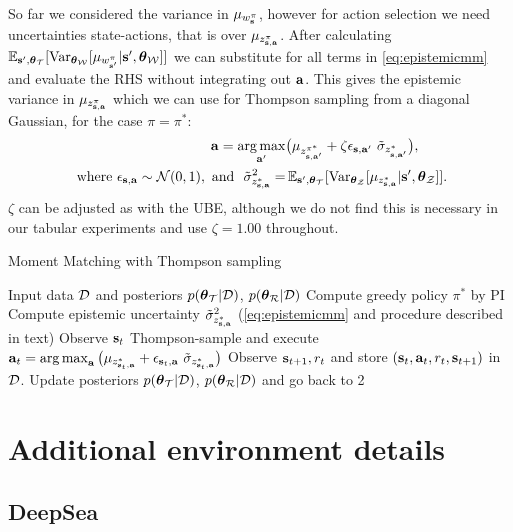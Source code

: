 \documentclass{article}
\begin{document}
\begin{appendices}
So far we considered the variance in $\mu_{w^\pi_{\mathbf{s}}}$, however for action selection we need uncertainties state-actions, that is over $\mu_{z^\pi_{\mathbf{s}, \mathbf{a}}}$. After calculating $\operatorname{\mathbb{E}}_{\mathbf{s}', \boldsymbol{\theta}_{\mathcal{T}}}[\operatorname{\text{Var}}_{\boldsymbol{\theta}_{\mathcal{W}}} [ \mu_{w^\pi_{\mathbf{s}'}} | \mathbf{s}', \boldsymbol{\theta}_{\mathcal{W}}]]$ we can substitute for all terms in \cref{eq:epistemicmm} and evaluate the RHS without integrating out $\mathbf{a}$. This gives the epistemic variance in $\mu_{z^\pi_{\mathbf{s}, \mathbf{a}}}$ which we can use for Thompson sampling from a diagonal Gaussian, for the case $\pi = \pi^*$:
\begin{align*}
\mathbf{a} = \operatorname*{arg\,max}_{\mathbf{a}'} &\big(\mu_{z^{{\pi^*}}_{\mathbf{s}, \mathbf{a}'}} + \zeta \epsilon_{\mathbf{s}, \mathbf{a}'}~\tilde{\sigma}_{z^*_{\mathbf{s}, \mathbf{a}'}} \big),\\
\text{ where } \epsilon_{\mathbf{s}, \mathbf{a}} \sim \mathcal{N}(0, 1), \text{ and }~\tilde{\sigma}^2_{z^*_{\mathbf{s}, \mathbf{a}}} =& \operatorname{\mathbb{E}}_{\mathbf{s}', \boldsymbol{\theta}_{\mathcal{T}}}[\operatorname{\text{Var}}_{\boldsymbol{\theta}_{\mathcal{Z}}} [ \mu_{z^*_{\mathbf{s}, \mathbf{a}}} | \mathbf{s}', \boldsymbol{\theta}_{\mathcal{Z}}]].
\end{align*}
$\zeta$ can be adjusted as with the UBE, although we do not find this is necessary in our tabular experiments and use $\zeta = 1.00$ throughout.

\begin{algorithm}
  \caption{Moment Matching with Thompson sampling}\label{alg:tmm}
  \begin{algorithmic}[1]
\State Input data $\mathcal{D}$ and posteriors $p(\boldsymbol{\theta}_{\mathcal{T}} | \mathcal{D})$, $p(\boldsymbol{\theta}_{\mathcal{R}} | \mathcal{D})$
\State Compute greedy policy ${\pi^*}$ by PI
\State Compute epistemic uncertainty $\tilde{\sigma}_{z^*_{\mathbf{s}, \mathbf{a}}}^2$ (\cref{eq:epistemicmm} and procedure described in text)
 	\State Observe $\mathbf{s}_t$
	\State Thompson-sample and execute $\mathbf{a}_t = \operatorname*{arg\,max}_{\mathbf{a}} \big(\mu_{z_{\mathbf{s}_t, \mathbf{a}}^*} + \epsilon_{\mathbf{s}_t, \mathbf{a}}~\tilde{\sigma}_{z^*_{\mathbf{s}_t, \mathbf{a}}}\big)$
	\State Observe $\mathbf{s}_{t+1}, r_{t}$ and store $(\mathbf{s}_{t}, \mathbf{a}_t, r_{t}, \mathbf{s}_{t+1})$ in $\mathcal{D}$.
 \EndFor
 \State Update posteriors $p(\boldsymbol{\theta}_{\mathcal{T}} | \mathcal{D})$, $p(\boldsymbol{\theta}_{\mathcal{R}} | \mathcal{D})$ and go back to 2
\end{algorithmic}
\end{algorithm}

\clearpage

\section{Additional environment details} \label{app:env}

\subsection{DeepSea}


\end{appendices}
\end{document}
